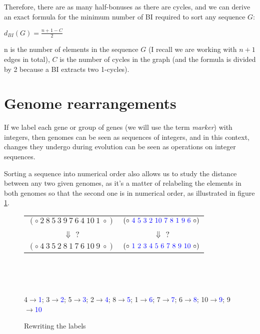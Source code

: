 \documentclass[11pt,final,twoside,nofrench]{thlifl}
\begin{document}
Therefore, there are as many half-bonuses as there are cycles, and we can derive an exact formula for the minimum number of BI required to sort any sequence $G$:

\begin{center}
$d_{BI}(G) = \frac{n + 1 - C}{2}$
\end{center}

n is the number of elements in the sequence $G$ (I recall we are working with $n+1$ edges in total), $C$ is the number of cycles in the graph (and the formula is divided by 2 because a BI extracts two 1-cycles).

\section{Genome rearrangements}

If we label each gene or group of genes (we will use the term \emph{marker}) with integers, then genomes can be seen as sequences of integers, and in this context, changes they undergo during evolution can be seen as operations on integer sequences.

Sorting a sequence into numerical order also allows us to study the distance between any two given genomes, as it's a matter of relabeling the elements in both genomes so that the second one is in numerical order, as illustrated in figure \ref{fig:rewriting}.

\begin{figure}[h!]
\begin{center}
\begin{tabular}{c | c}
$(\circ~2~8~5~3~9~7~6~4~10~1~\circ)$ & $(\circ~\textcolor{blue}{4~5~3~2~10~7~8~1~9~6}~\circ)$ \\

$\Downarrow$ ? & $\Downarrow$ ? \\

$(\circ~4~3~5~2~8~1~7~6~10~9~\circ)$ & $(\circ~\textcolor{blue}{1~2~3~4~5~6~7~8~9~10}~\circ)$
\end{tabular}

~

~

4$\rightarrow$\textcolor{blue}{1};
3$\rightarrow$\textcolor{blue}{2};
5$\rightarrow$\textcolor{blue}{3};
2$\rightarrow$\textcolor{blue}{4};
8$\rightarrow$\textcolor{blue}{5};
1$\rightarrow$\textcolor{blue}{6};
7$\rightarrow$\textcolor{blue}{7};
6$\rightarrow$\textcolor{blue}{8};
10$\rightarrow$\textcolor{blue}{9};
9$\rightarrow$\textcolor{blue}{10}
\end{center}

\caption{Rewriting the labels}
\label{fig:rewriting}
\end{figure}
\end{document}
